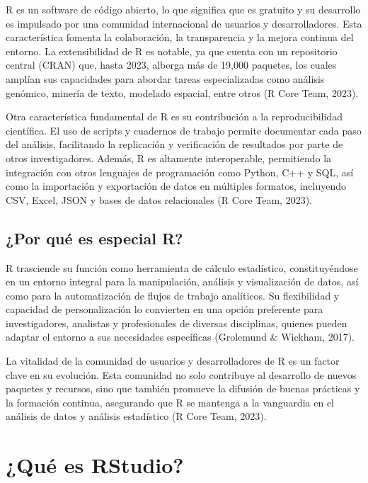 \documentclass[
  spanish,
  a4paper,
  DIV=11,
  numbers=noendperiod,
  onepage,
  openany]{scrreprt}
\begin{document}
R es un software de código abierto, lo que significa que es gratuito y
su desarrollo es impulsado por una comunidad internacional de usuarios y
desarrolladores. Esta característica fomenta la colaboración, la
transparencia y la mejora continua del entorno. La extensibilidad de R
es notable, ya que cuenta con un repositorio central (CRAN) que, hasta
2023, alberga más de 19,000 paquetes, los cuales amplían sus capacidades
para abordar tareas especializadas como análisis genómico, minería de
texto, modelado espacial, entre otros (R Core Team, 2023).

Otra característica fundamental de R es su contribución a la
reproducibilidad científica. El uso de scripts y cuadernos de trabajo
permite documentar cada paso del análisis, facilitando la replicación y
verificación de resultados por parte de otros investigadores. Además, R
es altamente interoperable, permitiendo la integración con otros
lenguajes de programación como Python, C++ y SQL, así como la
importación y exportación de datos en múltiples formatos, incluyendo
CSV, Excel, JSON y bases de datos relacionales (R Core Team, 2023).

\subsection{¿Por qué es especial R?}\label{por-quuxe9-es-especial-r}

R trasciende su función como herramienta de cálculo estadístico,
constituyéndose en un entorno integral para la manipulación, análisis y
visualización de datos, así como para la automatización de flujos de
trabajo analíticos. Su flexibilidad y capacidad de personalización lo
convierten en una opción preferente para investigadores, analistas y
profesionales de diversas disciplinas, quienes pueden adaptar el entorno
a sus necesidades específicas (Grolemund \& Wickham, 2017).

La vitalidad de la comunidad de usuarios y desarrolladores de R es un
factor clave en su evolución. Esta comunidad no solo contribuye al
desarrollo de nuevos paquetes y recursos, sino que también promueve la
difusión de buenas prácticas y la formación continua, asegurando que R
se mantenga a la vanguardia en el análisis de datos y análisis
estadístico (R Core Team, 2023).

\section{¿Qué es RStudio?}\label{quuxe9-es-rstudio}
\end{document}
